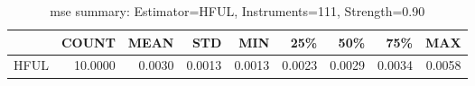 \begin{table}[ht]
\centering
\caption{mse summary: Estimator=HFUL, Instruments=111, Strength=0.90}
\begin{tabular}{lrrrrrrrr}
\toprule
 & COUNT & MEAN & STD & MIN & 25\% & 50\% & 75\% & MAX \\
\midrule
HFUL & 10.0000 & 0.0030 & 0.0013 & 0.0013 & 0.0023 & 0.0029 & 0.0034 & 0.0058 \\
\bottomrule
\end{tabular}
\end{table}
